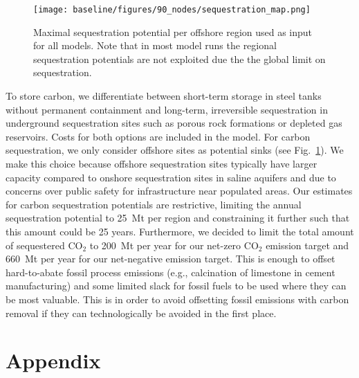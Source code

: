 \documentclass[twocolumn]{article}
\newcommand{\carbon}{CO$_2$}
\begin{document}

\begin{figure}[h!]
    \centering
    \texttt{[image: baseline/figures/90\_nodes/sequestration\_map.png]}
    \caption{Maximal sequestration potential per offshore region used as input for all models. Note that in most model runs the regional sequestration potentials are not exploited due the the global limit on sequestration.}
    \label{fig:sequestration_map}
\end{figure}

To store carbon, we differentiate between short-term storage in steel tanks without permanent containment and long-term, irreversible sequestration in underground sequestration sites such as porous rock formations or depleted gas reservoirs.
Costs for both options are included in the model.
For carbon sequestration, we only consider offshore sites as potential sinks (see Fig.~\ref{fig:sequestration_map}).
We make this choice because offshore sequestration sites typically have larger capacity compared to onshore sequestration sites in saline aquifers and due to concerns over public safety for infrastructure near populated areas.
Our estimates for carbon sequestration potentials are restrictive, limiting the annual sequestration potential to 25~Mt per region and constraining it further such that this amount could be  25 years.
Furthermore, we decided to limit the total amount of sequestered \carbon{} to 200~Mt per year for our net-zero \carbon{} emission target and 660~Mt per year for our net-negative emission target.
This is enough to offset hard-to-abate fossil process emissions (e.g., calcination of limestone in cement manufacturing) and some limited slack for fossil fuels to be used where they can be most valuable.
This is in order to avoid offsetting fossil emissions with carbon removal if they can technologically be avoided in the first place.


\printbibliography

\newpage
\appendix
\setcounter{section}{0}
\renewcommand{\thesection}{\Alph{section}}
\renewcommand{\thefigure}{\Alph{section}.\arabic{figure}}

\onecolumn %

\section{Appendix}
\end{document}
